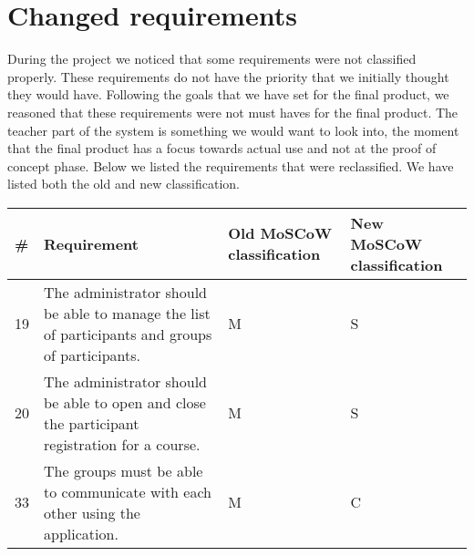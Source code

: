 \section{Changed requirements}
During the project we noticed that some requirements were not classified properly.
These requirements do not have the priority that we initially thought they would have.
Following the goals that we have set for the final product, we reasoned that these requirements were not must haves for the final product.
The teacher part of the system is something we would want to look into, the moment that the final product has a focus towards actual use and not at the proof of concept phase.
Below we listed the requirements that were reclassified.
We have listed both the old and new classification.\\
\begin{tabular}{ | p{0.5cm} | p{10cm} | p{2cm} | p{2cm} | }
\hline
\textbf{\#} & \textbf{Requirement} & \textbf{Old MoSCoW classification} & \textbf{New MoSCoW classification} \\ \hline
19 & The administrator should be able to manage the list of participants and groups of participants. & M & S \\ \hline
20 & The administrator should be able to open and close the participant registration for a course. & M & S \\ \hline
33 & The groups must be able to communicate with each other using the application. & M & C \\ \hline
\end{tabular}
